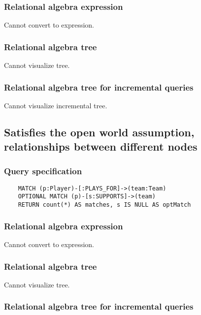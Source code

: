 	\subsubsection*{Relational algebra expression}

	Cannot convert to expression.

	\subsubsection*{Relational algebra tree}

	Cannot visualize tree.

	\subsubsection*{Relational algebra tree for incremental queries}

	Cannot visualize incremental tree.
	\subsection{Satisfies the open world assumption, relationships between different nodes}

	\subsubsection*{Query specification}

	\begin{lstlisting}
	MATCH (p:Player)-[:PLAYS_FOR]->(team:Team)
	OPTIONAL MATCH (p)-[s:SUPPORTS]->(team)
	RETURN count(*) AS matches, s IS NULL AS optMatch
	\end{lstlisting}


	\subsubsection*{Relational algebra expression}

	Cannot convert to expression.

	\subsubsection*{Relational algebra tree}

	Cannot visualize tree.

	\subsubsection*{Relational algebra tree for incremental queries}

